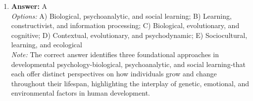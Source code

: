 \documentclass[12pt]{article}
\begin{document}
\begin{enumerate}[label=\arabic*.]
\\ \textit{Note:} In classical psychoanalytic theory, a symptom is understood as a maladaptive behavior that arises from the conflict between repressed unconscious impulses and the defense mechanisms employed to manage those impulses.
\item \textbf{Answer:} A
\\ \textit{Options:} A) Biological, psychoanalytic, and social learning; B) Learning, constructivist, and information processing; C) Biological, evolutionary, and cognitive; D) Contextual, evolutionary, and psychodynamic; E) Sociocultural, learning, and ecological
\\ \textit{Note:} The correct answer identifies three foundational approaches in developmental psychology-biological, psychoanalytic, and social learning-that each offer distinct perspectives on how individuals grow and change throughout their lifespan, highlighting the interplay of genetic, emotional, and environmental factors in human development.
\end{enumerate}
\end{document}
